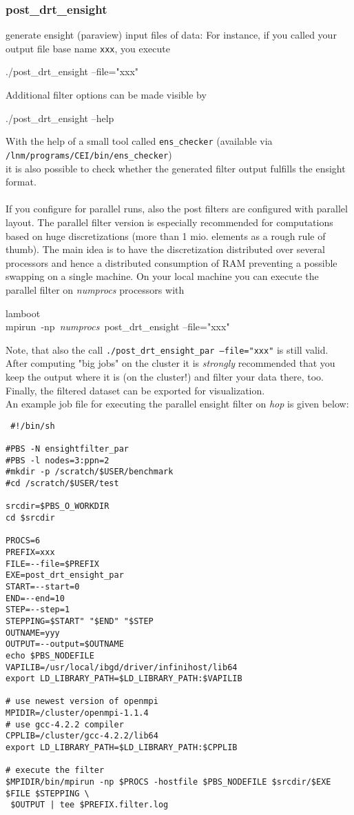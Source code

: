 \subsubsection{post\_drt\_ensight}
generate ensight (paraview) input files of \baci{} data: For
instance, if you
called your output file base name \texttt{xxx}, you execute
\begin{lyxcode}
./post\_drt\_ensight --file="xxx"
\end{lyxcode}
Additional filter options can be made visible by
\begin{lyxcode}
./post\_drt\_ensight --help
\end{lyxcode}
With the help of a small tool called \texttt{ens\_checker} (available via
 \texttt{/lnm/programs/CEI/bin/ens\_checker})\\
it is also possible to check whether the generated filter output fulfills the ensight format.\\
\\
If you configure \baci{} for parallel runs, also the post filters
are configured with parallel layout.
The parallel filter version is especially recommended for computations based on huge discretizations
(more than 1 mio. elements as a rough rule of thumb). The main idea is to have the discretization distributed over several processors and hence a distributed consumption of RAM preventing a possible swapping on a single machine.
On your local machine you can execute the parallel filter on \emph{numprocs} processors with
\begin{lyxcode}
lamboot\\
mpirun~-np~\emph{numprocs}~post\_drt\_ensight --file="xxx"
\end{lyxcode}
Note, that also the call
\texttt{./post\_drt\_ensight\_par --file="xxx"}
is still valid.\\
After computing "big jobs" on the cluster it is \emph{strongly} recommended that you keep the \baci{} output where it is (on the cluster!)
and filter your data there, too. Finally, the filtered dataset can be exported for visualization.\\
An example job file for executing the parallel ensight filter on \emph{hop} is given below:
\begin{verbatim}
 #!/bin/sh

#PBS -N ensightfilter_par
#PBS -l nodes=3:ppn=2
#mkdir -p /scratch/$USER/benchmark
#cd /scratch/$USER/test

srcdir=$PBS_O_WORKDIR
cd $srcdir

PROCS=6
PREFIX=xxx
FILE=--file=$PREFIX
EXE=post_drt_ensight_par
START=--start=0
END=--end=10
STEP=--step=1
STEPPING=$START" "$END" "$STEP
OUTNAME=yyy
OUTPUT=--output=$OUTNAME
echo $PBS_NODEFILE
VAPILIB=/usr/local/ibgd/driver/infinihost/lib64
export LD_LIBRARY_PATH=$LD_LIBRARY_PATH:$VAPILIB

# use newest version of openmpi
MPIDIR=/cluster/openmpi-1.1.4
# use gcc-4.2.2 compiler
CPPLIB=/cluster/gcc-4.2.2/lib64
export LD_LIBRARY_PATH=$LD_LIBRARY_PATH:$CPPLIB

# execute the filter
$MPIDIR/bin/mpirun -np $PROCS -hostfile $PBS_NODEFILE $srcdir/$EXE $FILE $STEPPING \
 $OUTPUT | tee $PREFIX.filter.log
\end{verbatim}


